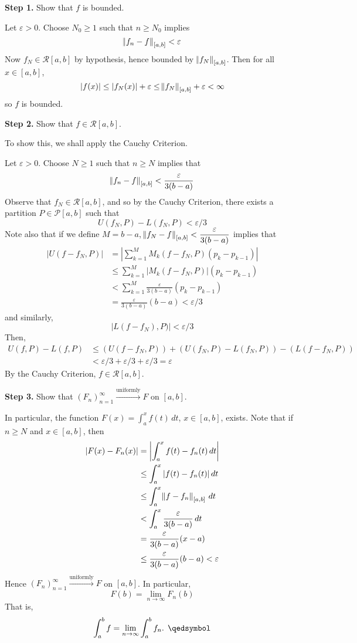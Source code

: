 \documentclass[11pt]{article}
\theoremstyle{definition}
\newcommand{\unif}{\xrightarrow{\text{uniformly}}}
\begin{document}
\textbf{Step 1.} Show that $f$ is bounded. 

Let $\varepsilon > 0$. Choose $N_0 \geq 1$ such that $n \geq N_0$ implies
$$\norm{f_n - f}_{[a, b]} < \varepsilon$$
Now $f_N \in \mathcal{R}[a, b]$ by hypothesis, hence bounded by $\norm{f_N}_{[a, b]}$. Then for all $x \in [a, b]$,
$$|f(x)| \leq |f_N(x)| + \varepsilon \leq \norm{f_N}_{[a, b]} + \varepsilon < \infty$$
so $f$ is bounded. 

\textbf{Step 2.} Show that $f \in \mathcal{R}[a, b]$.

To show this, we shall apply the Cauchy Criterion. 

Let $\varepsilon > 0$. Choose $N \geq 1$ such that $n \geq N$ implies that
$$\norm{f_n - f}_{[a, b]} < \frac{\varepsilon}{3(b-a)}$$
Observe that $f_N \in \mathcal{R}[a, b]$, and so by the Cauchy Criterion, there exists a partition $P \in \mathcal{P}[a, b]$ such that
$$U(f_N, P) - L(f_N, P) < \varepsilon / 3$$
Note also that if we define $M = b-a$, $\norm{f_N - f}_{[a, b]} < \dfrac{\varepsilon}{3(b-a)}$ implies that
\begin{align*}
|U(f - f_N, P)| & = \left| \sum_{k=1}^M M_k(f - f_N, P) (p_k - p_{k-1}) \right| \\
& \leq \sum_{k=1}^M |M_k(f - f_N, P)| (p_k - p_{k-1}) \\
& < \sum_{k=1}^M \frac{\varepsilon}{3(b-a)} (p_k - p_{k-1}) \\
& = \frac{\varepsilon}{3(b-a)} (b-a) < \varepsilon / 3
\end{align*}
and similarly,
$$|L(f - f_N), P)| < \varepsilon / 3$$
Then,
\begin{align*}
U(f, P) - L(f, P) & \leq \left(U(f - f_N, P)\right) + \left(U(f_N, P) - L(f_N, P)\right) - \left(L(f - f_N, P)\right) \\
& < \varepsilon / 3 + \varepsilon / 3 + \varepsilon / 3 = \varepsilon
\end{align*}
By the Cauchy Criterion, $f \in \mathcal{R}[a, b]$. 

\textbf{Step 3.} Show that $(F_n)_{n=1}^\infty \unif F$ on $[a, b]$. 

In particular, the function $F(x) = \int_a^x f(t)\,dt$, $x \in [a, b]$, exists. Note that if $n \geq N$ and $x \in [a, b]$, then
\begin{align*}
|F(x) - F_n(x)| & = \left| \int_a^x f(t) - f_n(t)\,dt \right| \\
& \leq \int_a^x |f(t) - f_n(t)|\,dt \\
& \leq \int_a^x \norm{f - f_n}_{[a, b]}\,dt \\
& < \int_a^x \frac{\varepsilon}{3(b-a)}\,dt \\
& = \frac{\varepsilon}{3(b-a)} (x-a) \\
& \leq \frac{\varepsilon}{3(b-a)} (b-a) < \varepsilon
\end{align*}
Hence $(F_n)_{n=1}^\infty \unif F$ on $[a, b]$. In particular,
$$F(b) = \lim_{n\to\infty} F_n(b)$$
That is,
$$\int_a^b f = \lim_{n\to\infty} \int_a^b f_n \text{. } \qedsymbol$$
\end{document}
